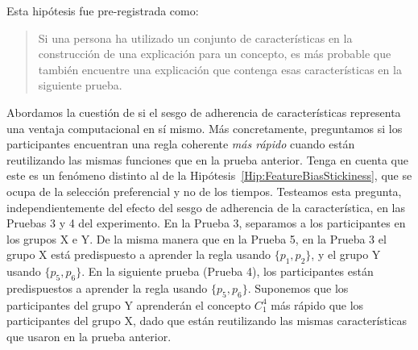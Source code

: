 \begin{hyp}
Esta hipótesis fue pre-registrada como:
\begin{quote}
Si una persona ha utilizado un conjunto de características en la construcción de una explicación para un concepto, es más probable que también encuentre una explicación que contenga esas características en la siguiente prueba.
\end{quote}
\end{hyp}


\begin{hyp}\label{Hip:FeatureBiasTimeAdvantage}
Abordamos la cuestión de si el sesgo de adherencia de características representa una ventaja computacional en sí mismo. Más concretamente, preguntamos si los participantes encuentran una regla coherente {\em más rápido} cuando están reutilizando las mismas funciones que en la prueba anterior. Tenga en cuenta que este es un fenómeno distinto al de la Hipótesis~\ref{Hip:FeatureBiasStickiness}, que se ocupa de la selección preferencial y no de los tiempos.
Testeamos esta pregunta, independientemente del efecto del sesgo de adherencia de la característica, en las Pruebas 3 y 4 del experimento. En la Prueba 3, separamos a los participantes en los grupos X e Y. De la misma manera que en la Prueba 5, en la Prueba 3 el grupo X está predispuesto a aprender la regla usando $\{p_1, p_2 \} $, y el grupo Y usando $\{p_5, p_6 \} $. En la siguiente prueba (Prueba 4), los participantes están predispuestos a aprender la regla usando $\{p_5, p_6 \} $. Suponemos que los participantes del grupo Y aprenderán el concepto $ C^4_1 $ más rápido que los participantes del grupo X, dado que están reutilizando las mismas características que usaron en la prueba anterior.


\end{hyp}
